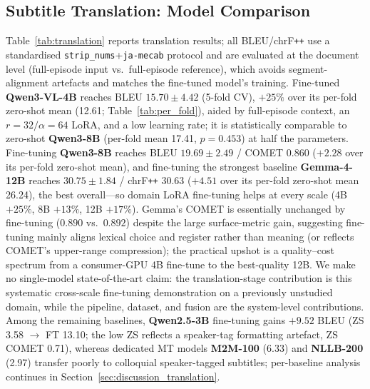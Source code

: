 \documentclass[journal]{IEEEtran}
\begin{document}
\subsection{Subtitle Translation: Model Comparison}
\label{sec:translation_results}

Table~\ref{tab:translation} reports translation results; all BLEU/chrF\texttt{++} use a standardised \texttt{strip\_nums}+\texttt{ja-mecab} protocol and are evaluated at the document level (full-episode input vs.\ full-episode reference), which avoids segment-alignment artefacts and matches the fine-tuned model's training.
Fine-tuned \textbf{Qwen3-VL-4B} reaches BLEU $15.70\pm4.42$ (5-fold CV), $+25\%$ over its per-fold zero-shot mean (12.61; Table~\ref{tab:per_fold}), aided by full-episode context, an $r{=}32/\alpha{=}64$ LoRA, and a low learning rate; it is statistically comparable to zero-shot \textbf{Qwen3-8B} (per-fold mean 17.41, $p=0.453$) at half the parameters.
Fine-tuning \textbf{Qwen3-8B} reaches BLEU $19.69\pm2.49$ / COMET $0.860$ ($+2.28$ over its per-fold zero-shot mean), and fine-tuning the strongest baseline \textbf{Gemma-4-12B} reaches $30.75\pm1.84$ / chrF\texttt{++} $30.63$ ($+4.51$ over its per-fold zero-shot mean 26.24), the best overall---so domain LoRA fine-tuning helps at every scale (4B $+25\%$, 8B $+13\%$, 12B $+17\%$).
Gemma's COMET is essentially unchanged by fine-tuning ($0.890$ vs.\ $0.892$) despite the large surface-metric gain, suggesting fine-tuning mainly aligns lexical choice and register rather than meaning (or reflects COMET's upper-range compression); the practical upshot is a quality--cost spectrum from a consumer-GPU 4B fine-tune to the best-quality 12B.
We make no single-model state-of-the-art claim: the translation-stage contribution is this systematic cross-scale fine-tuning demonstration on a previously unstudied domain, while the pipeline, dataset, and fusion are the system-level contributions.
Among the remaining baselines, \textbf{Qwen2.5-3B} fine-tuning gains $+9.52$ BLEU (ZS 3.58 $\to$ FT 13.10; the low ZS reflects a speaker-tag formatting artefact, ZS COMET 0.71), whereas dedicated MT models \textbf{M2M-100} (6.33) and \textbf{NLLB-200} (2.97) transfer poorly to colloquial speaker-tagged subtitles; per-baseline analysis continues in Section~\ref{sec:discussion_translation}.
\end{document}
